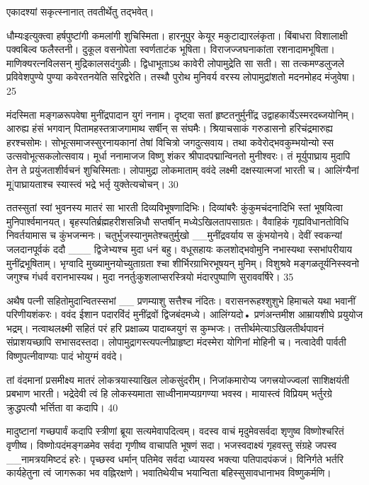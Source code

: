 एकादश्यां सकृत्स्नानात् तवतीर्थेतु तद्भवेत्।

धौम्यःइत्युक्त्वा हर्षपुष्टांगी कमलांगी शुचिस्मिता।
हारनूपुर केयूर मकुटाद्यारलंकृता।
बिंबाधरा विशालाक्षी पक्वबिल्व फलैस्तनी।
दुकूल वसनोपेता स्वर्णताटंक भूषिता।
विराजज्जघनाकांता रशनादामभूषिता।
माणिक्यरत्नविलसन् मुद्रिकालसदंगुळीः।
द्विधाभूताऽथ कावेरी लोपामुद्रेति सा सती।
सा तत्कमण्डलुजले प्रविवेशपुण्ये
पुण्या कवेरतनयेति सरिद्वरेति।
तस्थौ पुरोथ मुनिवर्य वरस्य
लोपामुद्रांशतो मदनमोहद मंजुवेषा।
25

मंदस्मिता मङ्गळरूपवेषा मुनींद्रपादान युगं ननाम।
दृष्ट्वा सतां हृष्टतनुर्मुनींद्र
उद्वाहकार्येऽस्मरदब्जयोनिम्।
आरुह्य हंसं भगवान् पितामहस्तत्राजगामाथ
सर्षीन् स संघमैः।
श्रियाचसाकं गरुडासनो
हरिचंद्रमारुह्य हरश्चसोमः।
सोभूत्समाजस्सुरनायकानां तेषां
विचित्रो जगदुत्सवाय।
तथा कवेरोद्भवकुम्भयोन्यो
स्स उत्सवोभूत्सकलोत्सवाय।
मूर्धा ननामाजज विष्णु शंकर
श्रीपादपद्मान्विनतो मुनीश्वरः।
तं मूर्युपाघ्राय मुदापि तेन ते
प्रयुंजताशीर्वचनं शुचिस्मिताः।
लोपामुद्रा लोकमाताम् ववंदे लक्ष्मी
दक्षस्यात्मजां भारती च।
आलिंग्यैनां मू[पाघ्रायताश्च स्यास्त्वं
भद्रे भर्तृ युक्तेत्यचोचन्।
30

ततस्सुतां स्वां भुवनस्य मातरं
सा भारती दिव्यविभूषणादिभिः।
दिव्यांबरैः कुंकुमचंदनादिभि स्तां
भूषयित्वा मुनिपार्श्वमानयत्।
बृहस्पतिर्ब्रह्महरीशसन्निधौ
सप्तर्षीन् मध्येऽखिलतापसाग्रतः।
वैवाहिकं गृह्यविधानतोविधि
निवर्तयामास च कुंभजन्मनः।
चतुर्भुजस्यानुमतेश्चतुर्मुखो
__मुनींद्रवर्याय स कुंभयोनये।
देवीं स्वकन्यां जलदानपूर्वकं ददौ
___ द्विजेभ्यश्च मुदा धनं बहु।
वधूसहायः कलशोद्भवोमुनि
नभास्यथा
स्सभांपरीयाय मुनींद्रभूषिताम्।
भृग्वादि मुख्यामुनयोच्युताग्रता
श्चा शीर्भिरग्राभिरभूषयन् मुनिम्।
विशुश्रवे मङ्गळतूर्यनिस्स्वनो जगुश्च
गंधर्व वरानभास्यथ।
मुदा ननर्तुःकुशलाप्सरस्त्रियो
मंदारपुष्पाणि सुराववर्षिरे।
35

अथैष पत्नी सहितोमुदान्वितस्सभां
__ प्रणम्याशु सत्तैश्च नंदितः।
वरासनरूहश्शुशुभे हिमाचले यथा
भवानीं परिणीयशंकरः।
ववंद ईशान पदारविंदं मुनींद्रवों द्विजबंदमध्ये।
आलिंग्यदो• प्रणंअन्तमीश
आम्रायशीघे प्रयुयोज भद्रम्।
नत्वाथलक्ष्मी सहितं परं हरि प्रक्षाळ्य
पादाब्जयुगं स कुम्भजः।
तत्तीर्थमेत्याऽखिलतीर्थपावनं
संप्राशयच्छापि सभासदस्तदा।
लोपामुद्रागस्त्यपत्नीप्राहृष्टा मंदस्मेरा
योगिनां मोहिनी च।
नत्वादेवी पार्वती विष्णुपत्नीवाण्याः पादं
भोयुग्मं ववंदे।

तां वंदमानां प्रसमीक्ष्य मातरं
लोकत्रयास्याखिल लोकसुंदरीम्।
निजांकमारोप्य जगत्त्रयोज्ज्वलां
साशिक्षयंती प्रबभाण भारती।
भद्रेदेवी त्वं हि लोकस्यमाता
साध्वीनामप्यग्रगण्या भवस्व।
मायास्त्वं विप्रियम् भर्तुरग्रे क्रुद्धपत्यौ
भर्त्तिता वा कदापि।
40

मादुष्टानां गच्छपार्वं कदापि
स्त्रीणां ब्रूया सत्यमेवापदित्वम्।
वदस्व वाचं मृदुमेवसर्वदा शृणुष्व
विष्णोश्चरितं वृणीष्व।
विष्णोःपदंमङ्गळमेव सर्वदा गृणीष्व
वाचापति भूषणं सदा।
भजस्वदाक्ष्यं गृहवस्तु संग्रहे जपस्व
__नामत्रयमिष्टदं हरेः।
पृच्छस्व धर्मान् पतिमेव सर्वदा ध्यायस्व
भक्त्या पतिपादपंकजं।
विनिर्गते भर्तरि कार्यहेतुना त्वं जागरूका
भव वह्निरक्षणे।
भवातिथेयीच भयान्विता
बहिस्सुसावधानाभव विष्णुकर्मणि।

